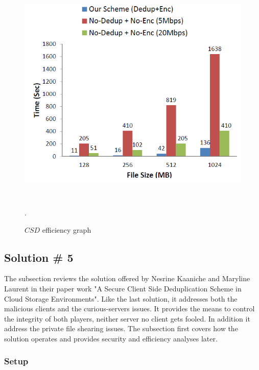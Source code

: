 \documentclass[12pt]{article}
\begin{document}
\begin{figure}[ht] 
\begin{center}
\includegraphics[height=310pt,width=400pt]{CSD}
\caption{$CSD$ efficiency graph}
\label{fig:CSD} .
\end{center}
\end{figure}

\pagebreak

\subsection{Solution \# 5}
\label{sub:Soltuion5}
The subsection reviews the solution offered by Nesrine Kaaniche and Maryline Laurent in their paper work "A Secure Client Side Deduplication Scheme in Cloud Storage Environments".\cite{Kaaniche} Like the last solution, it addresses both the malicious clients and the curious-servers issues. It provides the means to control the integrity of both players, neither server no client gets fooled. In addition it address the private file shearing issues. The subsection first covers how the solution operates and provides security and efficiency analyses later.

\subsubsection{Setup}
\label{subsub:setup5}
\end{document}
